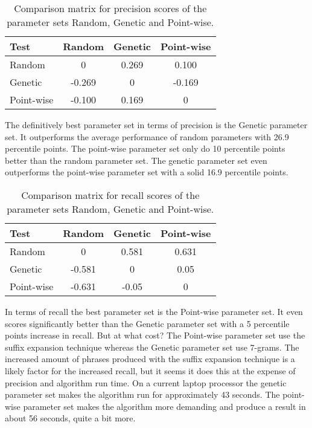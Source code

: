 \begin{table}[H]
\begin{center}
\begin{tabular}{|l|ccc|}
\hline
Test & 			Random 	& 	Genetic 	& Point-wise\\ 
\hline
Random 		&  	  0 	& 	0.269		&  0.100\\ 
Genetic 	&   -0.269 	&      0  		&  -0.169\\ 
Point-wise 	&   -0.100 	&    0.169 		&  0  \\ 
\hline
\end{tabular}
\end{center}
\caption{Comparison matrix for precision scores of the parameter sets Random, Genetic and Point-wise.}
\label{tab:summaryprecisiontableresults}
\end{table}

The definitively best parameter set in terms of precision is the Genetic parameter set. It outperforms the average performance of random parameters with 26.9 percentile points. The point-wise parameter set only do 10 percentile points better than the random parameter set. The genetic parameter set even outperforms the point-wise parameter set with a solid 16.9 percentile points.

\begin{table}[H]
\begin{center}
\begin{tabular}{|l|ccc|}
\hline
Test & 			Random 	& 	Genetic 	& Point-wise\\ 
\hline
Random 		&  	  0 	& 	0.581		&  0.631\\ 
Genetic 	&   -0.581 	&     0  		&  0.05\\ 
Point-wise 	&   -0.631 	&   -0.05 		&  0  \\ 
\hline
\end{tabular}
\end{center}
\caption{Comparison matrix for recall scores of the parameter sets Random, Genetic and Point-wise.}
\label{tab:summaryrecalltableresults}
\end{table}

In terms of recall the best parameter set is the Point-wise parameter set. It even scores significantly better than the Genetic parameter set with a 5 percentile points increase in recall. But at what cost? The Point-wise parameter set use the suffix expansion technique whereas the Genetic parameter set use 7-grams. The increased amount of phrases produced with the suffix expansion technique is a likely factor for the increased recall, but it seems it does this at the expense of precision and algorithm run time. On a current laptop processor the genetic parameter set makes the algorithm run for approximately 43 seconds. The point-wise parameter set makes the algorithm more demanding and produce a result in about 56 seconds, quite a bit more.


